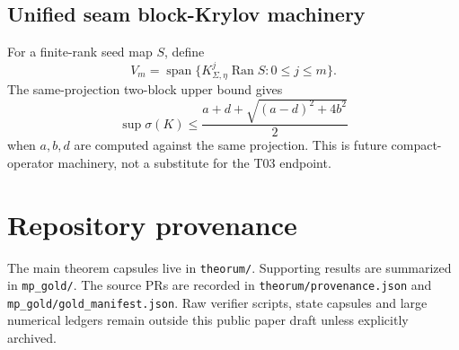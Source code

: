 \documentclass[11pt]{article}
\newcommand{\Ran}{\operatorname{Ran}}
\begin{document}
\subsection{Unified seam block-Krylov machinery}

For a finite-rank seed map \(S\), define
\[
V_m=\operatorname{span}\{K_{\Sigma,\eta}^j\Ran S:0\le j\le m\}.
\]
The same-projection two-block upper bound gives
\[
\sup\sigma(K)
\le
\frac{a+d+\sqrt{(a-d)^2+4b^2}}{2}
\]
when \(a,b,d\) are computed against the same projection.  This is future compact-operator machinery, not a substitute for the T03 endpoint.

\section{Repository provenance}

The main theorem capsules live in \texttt{theorum/}.  Supporting results are summarized in \texttt{mp\_gold/}.  The source PRs are recorded in \texttt{theorum/provenance.json} and \texttt{mp\_gold/gold\_manifest.json}.  Raw verifier scripts, state capsules and large numerical ledgers remain outside this public paper draft unless explicitly archived.
\end{document}
